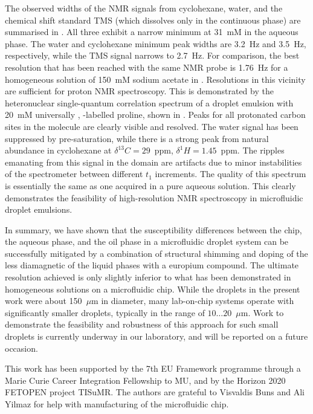 The observed widths of the NMR signals from cyclohexane, water, and the
chemical shift standard TMS (which dissolves only in the continuous phase)
are summarised in . All three exhibit a narrow
minimum at 31~mM  in the aqueous phase. The water and
cyclohexane minimum peak widths are 3.2~Hz and 3.5~Hz, respectively, while
the TMS signal narrows to 2.7~Hz. For comparison, the best resolution
that has been reached with the same NMR probe is 1.76~Hz for a homogeneous
solution of 150~mM sodium acetate in .\cite{Finch:2016gv}
Resolutions in this vicinity are sufficient for proton NMR spectroscopy.
This is demonstrated by the heteronuclear single-quantum correlation spectrum
of a droplet emulsion with 20~mM universally , -labelled
proline, shown in . Peaks for all protonated
carbon sites in the molecule are clearly visible and resolved. The water signal
has been suppressed by pre-saturation, while there is a strong peak from
natural abundance  in cyclohexane at $\delta^{13}C=29$~ppm,
$\delta^{1}H=1.45$~ppm. The ripples emanating from this signal in the 
domain are artifacts due to minor instabilities of the spectrometer between
different $t_1$ increments.
The quality of this spectrum is
essentially the same as one acquired in a pure aqueous solution. This clearly
demonstrates the feasibility of high-resolution NMR spectroscopy in microfluidic
droplet emulsions.

In summary, we have shown that the susceptibility differences between the chip,
the aqueous phase, and the oil phase in a microfluidic droplet system can
be successfully mitigated by a combination of structural shimming and
doping of the less diamagnetic of the liquid phases with a europium compound.
The ultimate resolution achieved is only slightly inferior to what has been
demonstrated in homogeneous solutions on a microfluidic chip. While the droplets
in the present work were about 150~$\mu$m in diameter, many lab-on-chip systems
operate with significantly smaller droplets, typically in the range of
$10\dots 20$~$\mu$m. Work to demonstrate the feasibility and robustness of
this approach for such small droplets is currently underway in our laboratory,
and will be reported on a future occasion.

This work has been supported by the 7th EU Framework programme through a
Marie Curie Career Integration Fellowship to MU, and by the Horizon 2020 FETOPEN
project TISuMR. The authors are grateful to Visvaldis Buns and Ali Yilmaz for help
with manufacturing of the microfluidic chip.

\scriptsize{
 } %
